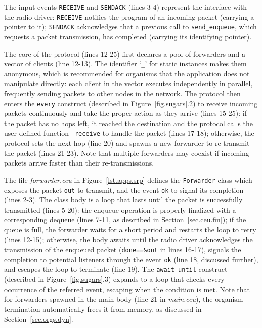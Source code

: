 \documentclass[preprint]{sigplanconf}
\newcommand{\code}[1] {{\small{\texttt{#1}}}}
\newcommand{\1}{\;}
\newcommand{\2}{\;\;}
\newcommand{\3}{\;\;\;}
\newcommand{\5}{\;\;\;\;\;}
\begin{document}
The input events \code{RECEIVE} and \code{SENDACK} (lines 3-4) represent the 
interface with the radio driver:
\code{RECEIVE} notifies the program of an incoming packet (carrying a pointer 
to it);
\code{SENDACK} acknowledges that a previous call to \code{send\_enqueue}, which 
requests a packet transmission, has completed (carrying its identifying 
pointer).  

The core of the protocol (lines 12-25) first declares a pool of forwarders and 
a vector of clients (line 12-13).
%
The identifier `\code{\_}' for static instances makes them anonymous, which is 
recommended for organisms that the application does not manipulate directly:
each client in the vector executes independently in parallel, frequently 
sending packets to other nodes in the network.
%
The protocol then enters the \code{every} construct (described in 
Figure~\ref{fig.sugars}.2) to receive incoming packets continuously and take 
the proper action as they arrive (lines 15-25):
if the packet has no hops left, it reached the destination and the protocol 
calls the user-defined function \code{\_receive} to handle the packet (lines 
17-18);
otherwise, the protocol sets the next hop (line 20) and spawns a new forwarder 
to re-transmit the packet (lines 21-23).
%
Note that multiple forwarders may coexist if incoming packets arrive faster 
than their re-transmissions.

The file \emph{forwarder.ceu} in Figure~\ref{lst.apps.srp} defines the 
\code{Forwarder} class which exposes the packet \code{out} to transmit, and the 
event \code{ok} to signal its completion (lines 2-3).
%
The class body is a loop that lasts until the packet is successfully 
transmitted (lines 5-20):
the enqueue operation is properly finalized with a corresponding dequeue (lines 
7-11, as described in Section~\ref{sec.ceu.fin});
if the queue is full, the forwarder waits for a short period and restarts the 
loop to retry (lines 12-15);
otherwise, the body awaits until the radio driver acknowledges the transmission 
of the enqueued packet (\code{done==\&out} in lines 16-17), signals the 
completion to potential listeners through the event \code{ok} (line 18, 
discussed further), and escapes the loop to terminate (line 19).
The \code{await-until} construct (described in Figure~\ref{fig.sugars}.3) 
expands to a loop that checks every occurrence of the referred event, escaping 
when the condition is met.
%
Note that for forwarders spawned in the main body (line 21 in \emph{main.ceu}), 
the organism termination automatically frees it from memory, as discussed in 
Section~\ref{sec.orgs.dyn}.
\end{document}
